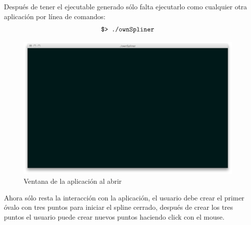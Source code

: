 \documentclass[]{article}
\begin{document}
Después de tener el ejecutable generado sólo falta ejecutarlo como cualquier otra aplicación por línea de comandos:
\[ \verb=$> ./ownSpliner= \]

\begin{figure}[ht] %
   \centering
   \includegraphics[width=\mySize in]{1.png} 
   \caption{Ventana de la aplicación al abrir}
   \label{fig:example}
\end{figure}

Ahora sólo resta la interacción con la aplicación, el usuario debe crear el primer óvalo con tres puntos
para iniciar el spline cerrado, después de crear los tres puntos el usuario puede crear nuevos puntos 
haciendo click con el mouse.
\end{document}

